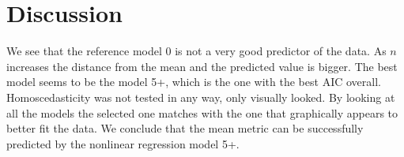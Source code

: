 \documentclass[a4paper]{article}
\begin{document}
\section{Discussion}
%
%
%
%
%
%
%
We see that the reference model 0 is not a very good predictor of the data. As 
$n$ increases the distance from the mean and the predicted value is bigger. The 
best model seems to be the model 5+, which is the one with the best AIC overall.
%
Homoscedasticity was not tested in any way, only visually looked.
%
By looking at all the models the selected one matches with the one that 
graphically appears to better fit the data.
%
We conclude that the mean metric can be successfully predicted by the nonlinear 
regression model 5+.
\end{document}
